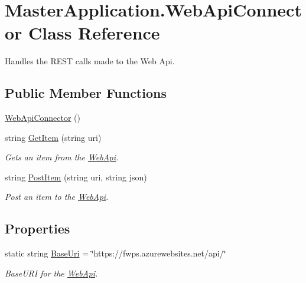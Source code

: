 \hypertarget{class_master_application_1_1_web_api_connector}{}\section{Master\+Application.\+Web\+Api\+Connector Class Reference}
\label{class_master_application_1_1_web_api_connector}


Handles the R\+E\+ST calls made to the Web Api.  


\subsection*{Public Member Functions}
\begin{DoxyCompactItemize}
\item 
\mbox{\hyperlink{class_master_application_1_1_web_api_connector_a2bc913b7f0eda0a71a83d9adda6578a2}{Web\+Api\+Connector}} ()
\item 
string \mbox{\hyperlink{class_master_application_1_1_web_api_connector_a2560aa84d88a9dc94d3d5a2d5844d0d5}{Get\+Item}} (string uri)
\begin{DoxyCompactList}\small\item\em Gets an item from the \mbox{\hyperlink{namespace_web_api}{Web\+Api}}. \end{DoxyCompactList}\item 
string \mbox{\hyperlink{class_master_application_1_1_web_api_connector_aa75d6d9b09024ecdafe0c5b2b5911505}{Post\+Item}} (string uri, string json)
\begin{DoxyCompactList}\small\item\em Post an item to the \mbox{\hyperlink{namespace_web_api}{Web\+Api}}. \end{DoxyCompactList}\end{DoxyCompactItemize}
\subsection*{Properties}
\begin{DoxyCompactItemize}
\item 
static string \mbox{\hyperlink{class_master_application_1_1_web_api_connector_adada9c227fb19e053af688062d548010}{Base\+Uri}} = \char`\"{}https\+://fwps.\+azurewebsites.\+net/api/\char`\"{}
\begin{DoxyCompactList}\small\item\em Base\+U\+RI for the \mbox{\hyperlink{namespace_web_api}{Web\+Api}}. \end{DoxyCompactList}\end{DoxyCompactItemize}


